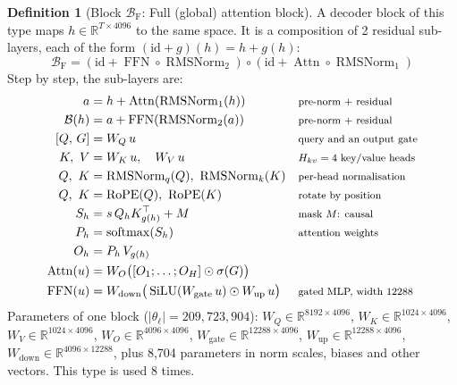 \documentclass[10pt,a4paper]{article}
\newcommand{\op}[1]{\operatorname{#1}}
\theoremstyle{definition}
\newtheorem{definition}{Definition}[section]
\begin{document}
\begin{definition}[Block $\mathcal{B}_{\mathrm{F}}$: Full (global) attention block]
A decoder block of this type maps $h\in\mathbb{R}^{T\times 4096}$ to the same space. It is a composition of 2 residual sub-layers, each of the form $(\mathrm{id}+g)(h)=h+g(h)$:
\begin{equation}
  \mathcal{B}_{\mathrm{F}} = (\mathrm{id}+\op{FFN}\circ \op{RMSNorm}_{2})\circ(\mathrm{id}+\op{Attn}\circ \op{RMSNorm}_{1})
\end{equation}
Step by step, the sub-layers are:
\begin{align*}
  a &= h + \op{Attn}(\op{RMSNorm}_{1}(h)) && \text{\footnotesize pre-norm + residual} \\
  \mathcal{B}(h) &= a + \op{FFN}(\op{RMSNorm}_{2}(a)) && \text{\footnotesize pre-norm + residual} \\
  [Q,\,G] &= W_Q\,u && \text{\footnotesize query and an output gate} \\
  K,\ V &= W_K\,u,\quad W_V\,u && \text{\footnotesize $H_{kv}=4$ key/value heads} \\
  Q,\ K &= \op{RMSNorm}_q(Q),\ \op{RMSNorm}_k(K) && \text{\footnotesize per-head normalisation} \\
  Q,\ K &= \op{RoPE}(Q),\ \op{RoPE}(K) && \text{\footnotesize rotate by position} \\
  S_h &= s\, Q_h K_{g(h)}^{\top} + M && \text{\footnotesize mask $M$: causal} \\
  P_h &= \op{softmax}(S_h) && \text{\footnotesize attention weights} \\
  O_h &= P_h\, V_{g(h)} \\
  \op{Attn}(u) &= W_O\big([O_1;\dots;O_H]\odot\sigma(G)\big) \\
  \op{FFN}(u) &= W_{\mathrm{down}}\big(\op{SiLU}(W_{\mathrm{gate}}\,u)\odot W_{\mathrm{up}}\,u\big) && \text{\footnotesize gated MLP, width 12288}
\end{align*}
Parameters of one block ($|\theta_\ell|=209{,}723{,}904$): $W_Q\in\mathbb{R}^{8192\times4096}$, $W_K\in\mathbb{R}^{1024\times4096}$, $W_V\in\mathbb{R}^{1024\times4096}$, $W_O\in\mathbb{R}^{4096\times4096}$, $W_{\mathrm{gate}}\in\mathbb{R}^{12288\times4096}$, $W_{\mathrm{up}}\in\mathbb{R}^{12288\times4096}$, $W_{\mathrm{down}}\in\mathbb{R}^{4096\times12288}$, plus 8,704 parameters in norm scales, biases and other vectors. This type is used 8 times.
\end{definition}
\end{document}

